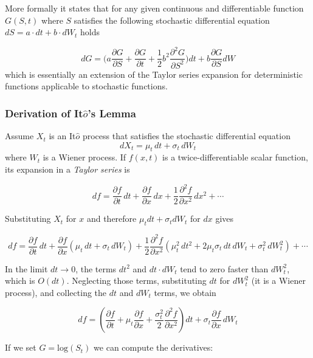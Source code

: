 More formally it states that for any given continuous and differentiable function \(G(S, t)\) where \(S\) satisfies the following stochastic differential equation \(dS=a\cdot dt +b\cdot dW_t\) holds

\begin{equation}
dG = \big(a\frac{\partial G}{\partial S} + \frac{\partial G}{\partial t} + \frac{1}{2}b^2\frac{\partial^2 G}{\partial S^2} \big)dt + b \frac{\partial G}{\partial S}dW
\label{eq:itos_lemma}
\end{equation}
which is essentially an extension of the Taylor series expansion for deterministic functions applicable to stochastic functions.

\begin{attention}
\subsubsection{Derivation of It$\hat{o}$'s Lemma}
Assume $X_t$ is an It$\hat{o}$ process that satisfies the stochastic differential equation
\begin{equation*}	
dX_{t}=\mu_{t}\,dt+\sigma_{t}\,dW_{t}
\end{equation*}
where $W_t$ is a Wiener process. If $f(x, t)$ is a twice-differentiable scalar function, its expansion in a \emph{Taylor series} is
	
\begin{equation*}
df={\frac {\partial f}{\partial t}}\,dt+{\frac {\partial f}{\partial x}}\,dx+{\frac {1}{2}}{\frac {\partial ^{2}f}{\partial x^{2}}}\,dx^{2}+\cdots 
\end{equation*}

Substituting $X_t$ for $x$ and therefore $\mu_t dt + \sigma_t dW_t$ for $dx$ gives
	
\begin{equation*}
df={\frac {\partial f}{\partial t}}\,dt+{\frac {\partial f}{\partial x}}(\mu _{t}\,dt+\sigma _{t}\,dW_{t})+{\frac {1}{2}}{\frac {\partial ^{2}f}{\partial x^{2}}}\left(\mu _{t}^{2}\,dt^{2}+2\mu _{t}\sigma _{t}\,dt\,dW_{t}+\sigma _{t}^{2}\,dW_{t}^{2}\right)+\cdots 
\end{equation*}

In the limit $dt\rightarrow 0$, the terms $dt^2$ and $dt\cdot dW_t$ tend to zero faster than $dW_t^2$, which is $O(dt)$. Neglecting those terms, substituting $dt$ for $dW_t^2$ (it is a Wiener process), and collecting the $dt$ and $dW_t$ terms, we obtain
	
\begin{equation*}
df=\left({\frac {\partial f}{\partial t}}+\mu _{t}{\frac {\partial f}{\partial x}}+{\frac {\sigma _{t}^{2}}{2}}{\frac {\partial ^{2}f}{\partial x^{2}}}\right)dt+\sigma _{t}{\frac {\partial f}{\partial x}}\,dW_{t}
\end{equation*}
\end{attention}
If we set \(G = \textrm{log}(S_t)\) we can compute the derivatives:

